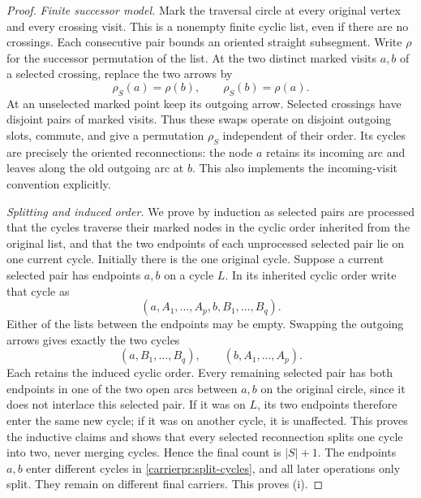 \begin{proof}\leanok
\emph{Finite successor model.}
Mark the traversal circle at every original vertex and every crossing
visit. This is a nonempty finite cyclic list, even if there are no
crossings. Each consecutive pair bounds an oriented straight
subsegment. Write $\rho$ for the successor permutation of the list.
At the two distinct marked visits $a,b$ of a selected crossing, replace
the two arrows by
\begin{equation}\label{carrierpr:successors}
\rho_S(a)=\rho(b),\qquad \rho_S(b)=\rho(a).
\end{equation}
At an unselected marked point keep its outgoing arrow. Selected
crossings have disjoint pairs of marked visits. Thus these swaps
operate on disjoint outgoing slots, commute, and give a permutation
$\rho_S$ independent of their order. Its cycles are precisely the
oriented reconnections: the node $a$ retains its incoming arc and
leaves along the old outgoing arc at $b$. This also implements the
incoming-visit convention explicitly.

\emph{Splitting and induced order.}
We prove by induction as selected pairs are processed that the cycles
traverse their marked nodes in the cyclic order inherited from the
original list, and that the two endpoints of each unprocessed selected
pair lie on one current cycle. Initially there is the one original
cycle. Suppose a current selected pair has endpoints $a,b$ on a cycle
$L$. In its inherited cyclic order write that cycle as
\begin{equation}\label{carrierpr:split-list}
(a,A_1,\ldots,A_p,b,B_1,\ldots,B_q).
\end{equation}
Either of the lists between the endpoints may be empty. Swapping the
outgoing arrows gives exactly the two cycles
\begin{equation}\label{carrierpr:split-cycles}
(a,B_1,\ldots,B_q),\qquad (b,A_1,\ldots,A_p).
\end{equation}
Each retains the induced cyclic order. Every remaining selected pair
has both endpoints in one of the two open arcs between $a,b$ on the
original circle, since it does not interlace this selected pair.
If it was on $L$, its two endpoints therefore enter the same new cycle;
if it was on another cycle, it is unaffected. This proves the inductive
claims and shows that every selected reconnection splits one cycle
into two, never merging cycles. Hence the final count is $|S|+1$.
The endpoints $a,b$ enter different cycles in
\eqref{carrierpr:split-cycles}, and all later operations only split.
They remain on different final carriers. This proves (i).


\end{proof}
